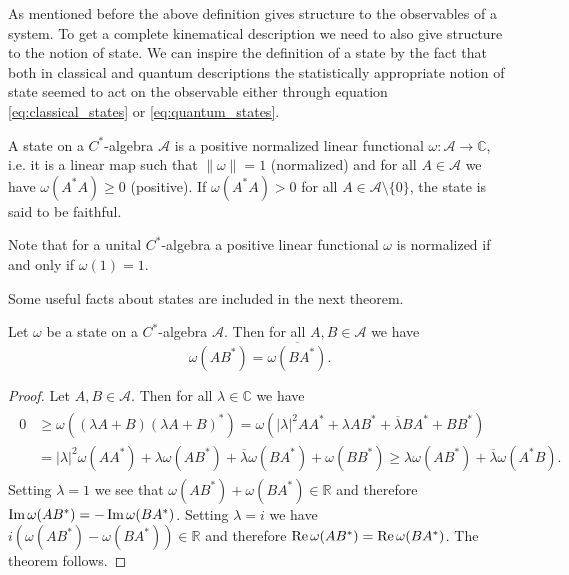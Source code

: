 As mentioned before the above definition gives structure to the observables of a system. To get a complete kinematical description we need to also give structure to the notion of state. We can inspire the definition of a state by the fact that both in classical and quantum descriptions the statistically appropriate notion of state seemed to act on the observable either through equation \ref{eq:classical_states} or \ref{eq:quantum_states}.

\begin{definition}
A state on a $C^*$-algebra $\mathcal{A}$ is a positive normalized linear functional $\omega:\mathcal{A}\rightarrow \mathbb{C}$, i.e. it is a linear map such that $\|\omega\| = 1$ (normalized) and for all $A\in\mathcal{A}$ we have $\omega(A^*A)\geq 0$ (positive). If $\omega(A^*A)>0$ for all $A\in\mathcal{A}\setminus\{0\}$, the state is said to be faithful.
\end{definition}  

Note that for a unital $C^*$-algebra a positive linear functional $\omega$ is normalized if and only if $\omega(1)=1$\cite{Bratteli1997}.

Some useful facts about states are included in the next theorem\cite{Bratteli1997}.

\begin{theorem}
Let $\omega$ be a state on a $C^*$-algebra $\mathcal{A}$. Then for all $A,B\in\mathcal{A}$ we have
\begin{equation}
\omega(AB^*)=\overline{\omega(BA^*)}.
\end{equation}
\end{theorem}

\begin{proof}
Let $A,B\in\mathcal{A}$. Then for all $\lambda\in\mathbb{C}$ we have
\begin{align}
\begin{split}
0 &\geq \omega((\lambda A + B)(\lambda A + B)^*)=\omega(|\lambda|^2AA^*+\lambda AB^* + \overline{\lambda}BA^*+BB^*) \\
&=|\lambda|^2\omega(AA^*)+\lambda \omega(AB^*) + \overline{\lambda}\omega(BA^*)+\omega(BB^*)\geq \lambda\omega(AB^*)+\overline{\lambda}\omega(A^*B).
\end{split}
\end{align}
Setting $\lambda=1$ we see that $\omega(AB^*)+\omega(BA^*)\in\mathbb{R}$ and therefore $\operatorname{Im}\omega(AB^*)=-\operatorname{Im}\omega(BA^*)$. Setting $\lambda = i$ we have $i(\omega(AB^*)-\omega(BA^*))\in\mathbb{R}$ and therefore $\operatorname{Re}\omega(AB^*)=\operatorname{Re}\omega(BA^*)$. The theorem follows. 
\end{proof}

